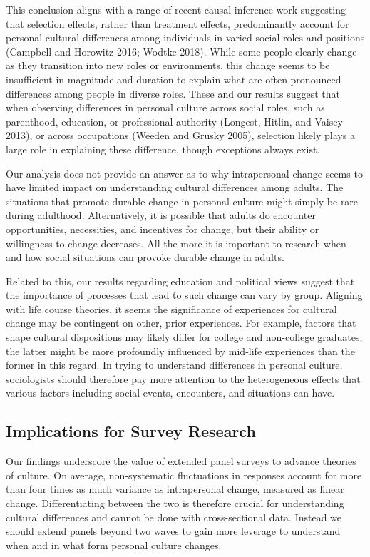 \documentclass[
  11pt,
]{article}
\begin{document}
This conclusion aligns with a range of recent causal inference work
suggesting that selection effects, rather than treatment effects,
predominantly account for personal cultural differences among
individuals in varied social roles and positions (Campbell and Horowitz
2016; Wodtke 2018). While some people clearly change as they transition
into new roles or environments, this change seems to be insufficient in
magnitude and duration to explain what are often pronounced differences
among people in diverse roles. These and our results suggest that when
observing differences in personal culture across social roles, such as
parenthood, education, or professional authority (Longest, Hitlin, and
Vaisey 2013), or across occupations (Weeden and Grusky 2005), selection
likely plays a large role in explaining these difference, though
exceptions always exist.

Our analysis does not provide an answer as to why intrapersonal change
seems to have limited impact on understanding cultural differences among
adults. The situations that promote durable change in personal culture
might simply be rare during adulthood. Alternatively, it is possible
that adults do encounter opportunities, necessities, and incentives for
change, but their ability or willingness to change decreases. All the
more it is important to research when and how social situations can
provoke durable change in adults.

Related to this, our results regarding education and political views
suggest that the importance of processes that lead to such change can
vary by group. Aligning with life course theories, it seems the
significance of experiences for cultural change may be contingent on
other, prior experiences. For example, factors that shape cultural
dispositions may likely differ for college and non-college graduates;
the latter might be more profoundly influenced by mid-life experiences
than the former in this regard. In trying to understand differences in
personal culture, sociologists should therefore pay more attention to
the heterogeneous effects that various factors including social events,
encounters, and situations can have.

\subsection{Implications for Survey
Research}\label{implications-for-survey-research}

Our findings underscore the value of extended panel surveys to advance
theories of culture. On average, non-systematic fluctuations in
responses account for more than four times as much variance as
intrapersonal change, measured as linear change. Differentiating between
the two is therefore crucial for understanding cultural differences and
cannot be done with cross-sectional data. Instead we should extend
panels beyond two waves to gain more leverage to understand when and in
what form personal culture changes.
\end{document}
